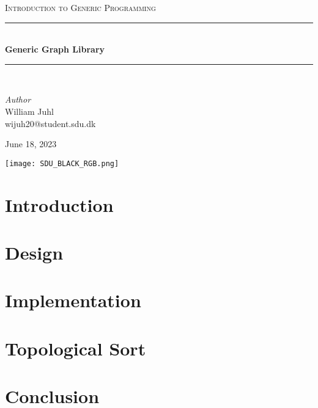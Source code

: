 \documentclass[a4paper,12pt]{report}
\newcommand{\HRule}{\rule{\linewidth}{0.5mm}}
\begin{document}
		
\begin{titlepage}

\center %

\textsc{\large Introduction to Generic Programming}\\[0.5cm]

\HRule\\[0.4cm]

{\huge\bfseries Generic Graph Library}\\[0.4cm]

\HRule\\[1.5cm]

\begin{minipage}{0.47\textwidth}
        \begin{flushleft}
                \large
                \textit{Author}\\
                William Juhl \\ 
                wijuh20@student.sdu.dk
        \end{flushleft}
\end{minipage}
\vfill\vfill

{\large June 18, 2023} %

\vfill\vfill
\texttt{[image: SDU\_BLACK\_RGB.png]}\\[1cm]

\vfill

\end{titlepage}



\newpage
\tableofcontents

\newpage
{} 
\setcounter{page}{1}

\chapter{Introduction}


\chapter{Design}


\chapter{Implementation}


\chapter{Topological Sort}


\chapter{Conclusion}

\end{document}
